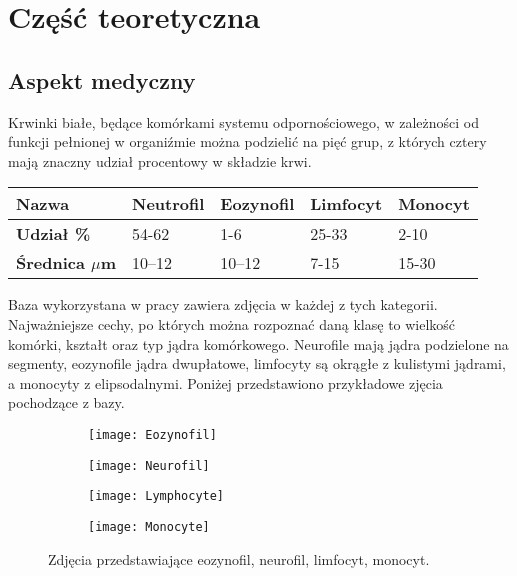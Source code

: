 \chapter{Część teoretyczna}
\label{cha:teoria}

\section{Aspekt medyczny}
Krwinki białe, będące komórkami systemu odpornościowego, w zależności od funkcji pełnionej w organiźmie można podzielić na pięć grup, z których cztery mają znaczny udział procentowy w składzie krwi.
\begin{table}[h]
\centering
\begin{tabular}{|l|l|l|l|l|}
\hline
\textbf{Nazwa}                               & Neutrofil & Eozynofil & Limfocyt & Monocyt \\ \hline
\textbf{Udział \%}\cite{lymphocytes_percentage} & 54-62   & 1-6    & 25-33  & 2-10  \\ \hline
\textbf{Średnica  \textbf{$\mu$}m}\cite{lymphocytes_percentage} & 10–12  & 10–12 & 7-15  & 15-30  \\ \hline
\end{tabular}
\end{table}

Baza wykorzystana w pracy zawiera zdjęcia w każdej z tych kategorii. Najważniejsze cechy, po których można rozpoznać daną klasę to wielkość komórki, kształt oraz typ jądra komórkowego. Neurofile mają jądra podzielone na segmenty, eozynofile jądra dwupłatowe, limfocyty są okrągłe z kulistymi jądrami, a monocyty z elipsodalnymi. \cite{lymphocytes_nucleus} Poniżej przedstawiono przykładowe zjęcia pochodzące z bazy.

\begin{figure}[h]
	\centering
	\begin{subfigure}{0.35\textwidth}
		\centering
		\texttt{[image: Eozynofil]}
		\subcaption{\label{subfigure_a}}
	\end{subfigure}
	\begin{subfigure}{0.35\textwidth}
		\centering
		\texttt{[image: Neurofil]}
		\subcaption{\label{subfigure_b}}
	\end{subfigure}
	\begin{subfigure}{0.35\textwidth}
		\centering
		\texttt{[image: Lymphocyte]}
		\subcaption{\label{subfigure_c}}
	\end{subfigure}
	\begin{subfigure}{0.35\textwidth}
		\centering
		\texttt{[image: Monocyte]}
		\subcaption{\label{subfigure_d}}
	\end{subfigure}
	
	\caption{\label{fig:subcaption_example}Zdjęcia przedstawiające \protect{} eozynofil, \protect{} neurofil,  \protect{} limfocyt,  \protect{} monocyt.}
\end{figure}

